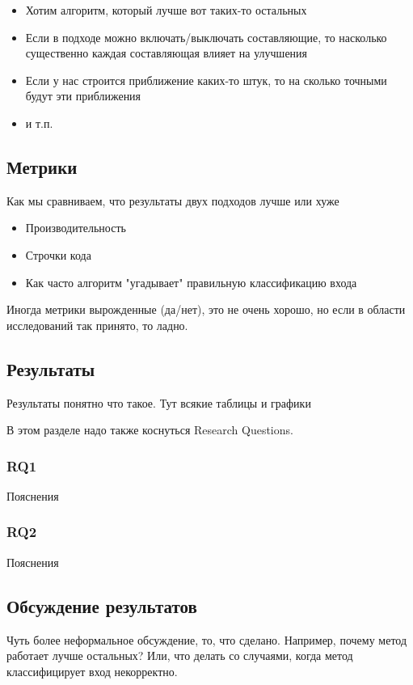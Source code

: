 \begin{itemize}
\item Хотим алгоритм, который лучше вот таких-то остальных
\item Если в подходе можно включать/выключать составляющие, то насколько существенно каждая составляющая влияет на улучшения
\item Если у нас строится приближение каких-то штук, то на сколько точными будут эти приближения
\item и т.п.
\end{itemize}

\subsection{Метрики}

Как мы сравниваем, что результаты двух подходов лучше или хуже
\begin{itemize}
\item Производительность
\item Строчки кода
\item Как часто алгоритм "угадывает" правильную классификацию входа
\end{itemize}

Иногда метрики вырожденные (да/нет), это не очень хорошо, но если в области исследований так принято, то ладно.

\subsection{Результаты}
Результаты понятно что такое. Тут всякие таблицы и графики

В этом разделе надо также коснуться Research Questions.

\subsubsection{RQ1} Пояснения
\subsubsection{RQ2} Пояснения

\subsection{Обсуждение результатов}

Чуть более неформальное обсуждение, то, что сделано. Например, почему метод работает лучше остальных? Или, что делать со случаями, когда метод классифицирует вход некорректно.

